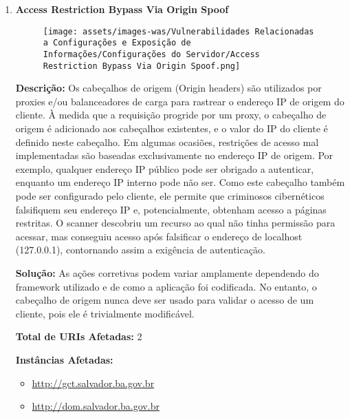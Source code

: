 \documentclass[a4paper,12pt]{article}
\begin{document}
\begin{enumerate}
\item \textbf{Access Restriction Bypass Via Origin Spoof}

                        \begin{figure}[h!]
                        \centering
                        \texttt{[image: assets/images-was/Vulnerabilidades Relacionadas a Configurações e Exposição de Informações/Configurações do Servidor/Access Restriction Bypass Via Origin Spoof.png]}
                        \end{figure}
                        \FloatBarrier
                        \textbf{Descrição:} Os cabeçalhos de origem (Origin headers) são utilizados por proxies e/ou balanceadores de carga para rastrear o endereço IP de origem do cliente. À medida que a requisição progride por um proxy, o cabeçalho de origem é adicionado aos cabeçalhos existentes, e o valor do IP do cliente é definido neste cabeçalho. Em algumas ocasiões, restrições de acesso mal implementadas são baseadas exclusivamente no endereço IP de origem. Por exemplo, qualquer endereço IP público pode ser obrigado a autenticar, enquanto um endereço IP interno pode não ser. Como este cabeçalho também pode ser configurado pelo cliente, ele permite que criminosos cibernéticos falsifiquem seu endereço IP e, potencialmente, obtenham acesso a páginas restritas. O scanner descobriu um recurso ao qual não tinha permissão para acessar, mas conseguiu acesso após falsificar o endereço de localhost (127.0.0.1), contornando assim a exigência de autenticação.

\textbf{Solução:} As ações corretivas podem variar amplamente dependendo do framework utilizado e de como a aplicação foi codificada. No entanto, o cabeçalho de origem nunca deve ser usado para validar o acesso de um cliente, pois ele é trivialmente modificável.

\textbf{Total de URIs Afetadas:} 2

\textbf{Instâncias Afetadas:}
\begin{itemize}
    \item \url{http://gct.salvador.ba.gov.br}
    \item \url{http://dom.salvador.ba.gov.br}
\end{itemize}

\end{enumerate}
\end{document}
